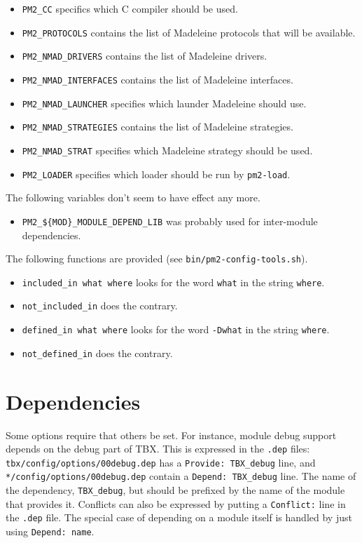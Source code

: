 \documentclass[11pt, a4paper ,twoside]{article}
\begin{document}
\begin{itemize}
\item \verb+PM2_CC+ specifics which C compiler should be used.
\item \verb+PM2_PROTOCOLS+ contains the list of Madeleine protocols that
will be available.
\item \verb+PM2_NMAD_DRIVERS+ contains the list of Madeleine drivers.
\item \verb+PM2_NMAD_INTERFACES+ contains the list of Madeleine
interfaces.
\item \verb+PM2_NMAD_LAUNCHER+ specifies which launder Madeleine should
use.
\item \verb+PM2_NMAD_STRATEGIES+ contains the list of Madeleine
strategies.
\item \verb+PM2_NMAD_STRAT+ specifies which Madeleine strategy should
be used.
\item \verb+PM2_LOADER+ specifies which loader should be run by
\verb+pm2-load+.
\end{itemize}

The following variables don't seem to have effect any more.
\begin{itemize}
\item \verb+PM2_${MOD}_MODULE_DEPEND_LIB+ was probably used for
inter-module dependencies.
\end{itemize}

The following functions are provided (see \verb+bin/pm2-config-tools.sh+).
\begin{itemize}
\item \verb+included_in what where+ looks for the word \verb+what+ in
the string \verb+where+.
\item \verb+not_included_in+ does the contrary.
\item \verb+defined_in what where+ looks for the word \verb+-Dwhat+ in
the string \verb+where+.
\item \verb+not_defined_in+ does the contrary.
\end{itemize}


\section{Dependencies}

Some options require that others be set.  For instance, module debug
support depends on the debug part of TBX.  This is expressed in
the \verb+.dep+ files: \verb+tbx/config/options/00debug.dep+ has a
\verb+Provide: TBX_debug+ line, and \verb+*/config/options/00debug.dep+
contain a \verb+Depend: TBX_debug+ line. The name of the dependency,
\verb+TBX_debug+, but should be prefixed by the name of the module that
provides it. Conflicts can also be expressed by putting a
\verb+Conflict:+ line in the \verb+.dep+ file. The special case of
depending on a module itself is handled by just using
\verb+Depend: name+.
\end{document}
